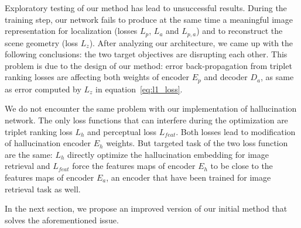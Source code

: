 Exploratory testing of our method has lead to unsuccessful results. During the training step, our network fails to produce at the same time a meaningful image representation for localization (losses $L_p$, $L_a$ and $L_{p,a}$) and to reconstruct the scene geometry (loss $L_z$). After analyzing our architecture, we came up with the following conclusions: the two target objectives are disrupting each other. This problem is due to the design of our method: error back-propagation from triplet ranking losses are affecting both weights of encoder $E_p$ and decoder $D_a$, as same as error computed by $L_z$ in equation~\ref{eq:l1_loss}. 

We do not encounter the same problem with our implementation of hallucination network. The only loss functions that can interfere during the optimization are triplet ranking loss $L_h$ and perceptual loss $L_{feat}$. Both losses lead to modification of hallucination encoder $E_h$ weights. But targeted task of the two loss function are the same: $L_h$ directly optimize the hallucination embedding for image retrieval and $L_{feat}$ force the features maps of encoder $E_h$ to be close to the features maps of encoder $E_a$, an encoder that have been trained for image retrieval task as well.

In the next section, we propose an improved version of our initial method that solves the aforementioned issue.
